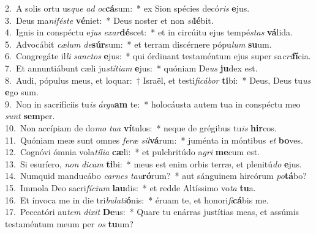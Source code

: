 {2.~}A solis ortu us\textit{que} \textit{ad} \textit{oc}\textbf{cá}sum:~* ex Sion spécies decó\textit{ris} \textbf{e}jus.\\
{3.~}Deus ma\textit{ni}\textit{fé}\textit{ste} \textbf{vé}niet:~* Deus noster et non \textit{si}\textbf{lé}bit.\\
{4.~}Ignis in conspéctu e\textit{jus} \textit{e}\textit{xar}\textbf{dé}scet:~* et in circúitu ejus tempé\textit{stas} \textbf{vá}lida.\\
{5.~}Advocábit \textit{cæ}\textit{lum} \textit{de}\textbf{súr}sum:~* et terram discérnere pópu\textit{lum} \textbf{su}um.\\
{6.~}Congregáte il\textit{li} \textit{san}\textit{ctos} \textbf{e}jus:~* qui órdinant testaméntum ejus super sa\textit{cri}\textbf{fí}cia.\\
{7.~}Et annuntiábunt cæli ju\textit{stí}\textit{ti}\textit{am} \textbf{e}jus:~* quóniam De\textit{us} \textbf{ju}dex est.\\
{8.~}Audi, pópulus meus, et loquar:~† Israël, et testi\textit{fi}\textit{cá}\textit{bor} \textbf{ti}bi:~* Deus, Deus tu\textit{us} \textbf{e}go sum.\\
{9.~}Non in sacrifíciis tu\textit{is} \textit{ár}\textit{gu}\textbf{am} te:~* holocáusta autem tua in conspéctu meo \textit{sunt} \textbf{sem}per.\\
{10.~}Non accípiam de do\textit{mo} \textit{tu}\textit{a} \textbf{ví}tulos:~* neque de grégibus tu\textit{is} \textbf{hir}cos.\\
{11.~}Quóniam meæ sunt omnes \textit{fe}\textit{ræ} \textit{sil}\textbf{vá}rum:~* juménta in móntibus \textit{et} \textbf{bo}ves.\\
{12.~}Cognóvi ómnia vola\textit{tí}\textit{li}\textit{a} \textbf{cæ}li:~* et pulchritúdo a\textit{gri} \textbf{me}cum est.\\
{13.~}Si esuríero, \textit{non} \textit{di}\textit{cam} \textbf{ti}bi:~* meus est enim orbis terræ, et plenitú\textit{do} \textbf{e}jus.\\
{14.~}Numquid manducábo \textit{car}\textit{nes} \textit{tau}\textbf{ró}rum?~* aut sánguinem hircórum \textit{po}\textbf{tá}bo?\\
{15.~}Immola Deo sacri\textit{fí}\textit{ci}\textit{um} \textbf{lau}dis:~* et redde Altíssimo vo\textit{ta} \textbf{tu}a.\\
{16.~}Et ínvoca me in die tri\textit{bu}\textit{la}\textit{ti}\textbf{ó}nis:~* éruam te, et honori\textit{fi}\textbf{cá}bis me.\\
{17.~}Peccatóri au\textit{tem} \textit{di}\textit{xit} \textbf{De}us:~* Quare tu enárras justítias meas, et assúmis testaméntum meum per \textit{os} \textbf{tu}um?\\
